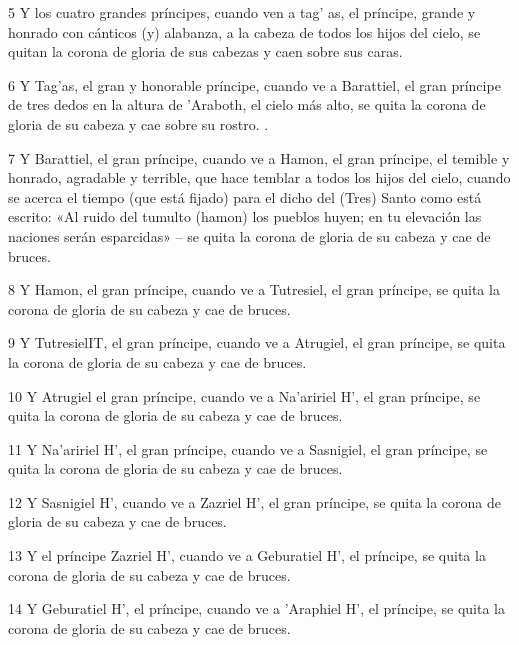 \par 5 Y los cuatro grandes príncipes, cuando ven a tag' as, el príncipe, grande y honrado con cánticos (y) alabanza, a la cabeza de todos los hijos del cielo, se quitan la corona de gloria de sus cabezas y caen sobre sus caras.

\par 6 Y Tag'as, el gran y honorable príncipe, cuando ve a Barattiel, el gran príncipe de tres dedos en la altura de 'Araboth, el cielo más alto, se quita la corona de gloria de su cabeza y cae sobre su rostro. .

\par 7 Y Barattiel, el gran príncipe, cuando ve a Hamon, el gran príncipe, el temible y honrado, agradable y terrible, que hace temblar a todos los hijos del cielo, cuando se acerca el tiempo (que está fijado) para el dicho del (Tres) Santo como está escrito: «Al ruido del tumulto (hamon) los pueblos huyen; en tu elevación las naciones serán esparcidas» – se quita la corona de gloria de su cabeza y cae de bruces.

\par 8 Y Hamon, el gran príncipe, cuando ve a Tutresiel, el gran príncipe, se quita la corona de gloria de su cabeza y cae de bruces.

\par 9 Y TutresielIT, el gran príncipe, cuando ve a Atrugiel, el gran príncipe, se quita la corona de gloria de su cabeza y cae de bruces.

\par 10 Y Atrugiel el gran príncipe, cuando ve a Na'aririel H', el gran príncipe, se quita la corona de gloria de su cabeza y cae de bruces.

\par 11 Y Na'aririel H', el gran príncipe, cuando ve a Sasnigiel, el gran príncipe, se quita la corona de gloria de su cabeza y cae de bruces.

\par 12 Y Sasnigiel H', cuando ve a Zazriel H', el gran príncipe, se quita la corona de gloria de su cabeza y cae de bruces.

\par 13 Y el príncipe Zazriel H', cuando ve a Geburatiel H', el príncipe, se quita la corona de gloria de su cabeza y cae de bruces.

\par 14 Y Geburatiel H', el príncipe, cuando ve a 'Araphiel H', el príncipe, se quita la corona de gloria de su cabeza y cae de bruces.

